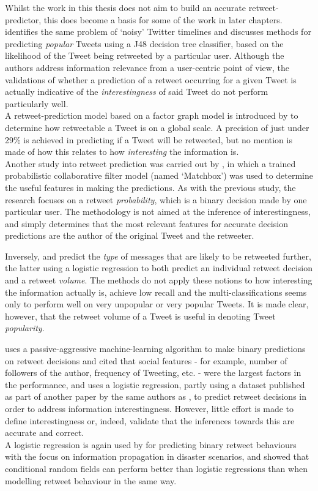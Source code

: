 Whilst the work in this thesis does not aim to build an accurate retweet-predictor, this does become a basis for some of the work in later chapters.\\
\cite{uysal11} identifies the same problem of `noisy' Twitter timelines and discusses methods for predicting \textit{popular} Tweets using a J48 decision tree classifier, based on the likelihood of the Tweet being retweeted by a particular user. Although the authors address information relevance from a user-centric point of view, the validations of whether a prediction of a retweet occurring for a given Tweet is actually indicative of the \textit{interestingness} of said Tweet do not perform particularly well.\\
A retweet-prediction model based on a factor graph model is introduced by \cite{yang10} to determine how retweetable a Tweet is on a global scale. A precision of just under 29\% is achieved in predicting if a Tweet will be retweeted, but no mention is made of how this relates to how \textit{interesting} the information is.\\
Another study into retweet prediction was carried out by \cite{zaman10}, in which a trained probabilistic collaborative filter model (named `Matchbox') was used to determine the useful features in making the predictions. As with the previous study, the research focuses on a retweet \textit{probability}, which is a binary decision made by one particular user. The methodology is not aimed at the inference of interestingness, and simply determines that the most relevant features for accurate decision predictions are the author of the original Tweet and the retweeter.

Inversely, \cite{suh10} and \cite{hong11} predict the \textit{type} of messages that are likely to be retweeted further, the latter using a logistic regression to both predict an individual retweet decision and a retweet \textit{volume}. The methods do not apply these notions to how interesting the information actually is, achieve low recall and the multi-classifications seems only to perform well on very unpopular or very popular Tweets. It is made clear, however, that the retweet volume of a Tweet is useful in denoting Tweet \textit{popularity}.

\cite{petrovic11} uses a passive-aggressive machine-learning algorithm to make binary predictions on retweet decisions and cited that social features - for example, number of followers of the author, frequency of Tweeting, etc. - were the largest factors in the performance, and \cite{naveed11} uses a logistic regression, partly using a dataset published as part of another paper by the same authors as \cite{petrovic11}, to predict retweet decisions in order to address information interestingness. However, little effort is made to define interestingness or, indeed, validate that the inferences towards this are accurate and correct.\\
A logistic regression is again used by \cite{zhu11} for predicting binary retweet behaviours with the focus on information propagation in disaster scenarios, and \cite{peng11} showed that conditional random fields can perform better than logistic regressions than when modelling retweet behaviour in the same way.


